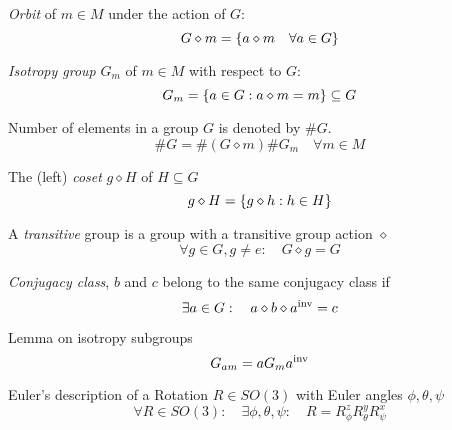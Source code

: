 			\noindent
			\emph{Orbit} of $m\in M$ under the action of $G$:
			\begin{equation}
				G \diamond m = \qty{ a\diamond m \quad \forall a \in G}
			\end{equation}

			\noindent
			\emph{Isotropy group} $G_m$ of $m\in M$ with respect to $G$:
			\begin{equation}
				G_m = \qty{a\in G: a\diamond m = m} \subseteq{G}
			\end{equation}			
			
			\noindent
			Number of elements in a group $G$ is denoted by $\# G$.
			\begin{equation}
				\# G = \#(G \diamond m) \#G_m \quad \forall m \in M
			\end{equation}

			\noindent
			The (left) \emph{coset} $g \diamond H$ of $H \subseteq G$
			\begin{equation}
				g \diamond H = \qty{g\diamond h: h\in H} 
			\end{equation}

			\noindent
			A \emph{transitive} group is a group with a transitive group action $\diamond$
			\begin{equation}
				\forall g \in G, g \ne e: \quad G \diamond g = G
			\end{equation}

			\noindent
			\emph{Conjugacy class}, $b$ and $c$ belong to the same conjugacy class if
			\begin{equation}
				\exists a \in G: \quad a \diamond b \diamond {a}^\mathrm{inv} = c
			\end{equation}

			\noindent
			Lemma on isotropy subgroups
			\begin{equation}
				G_{a m} = a G_{m} {a}^\mathrm{inv}
			\end{equation}
			
			\noindent
			Euler's description of a Rotation $R\in SO(3)$ with Euler angles $\phi, \theta, \psi$
			\begin{equation}
				\forall R \in SO(3):\quad \exists \phi, \theta, \psi:\quad R = R_\phi^z R_\theta^y R_\psi^x
			\end{equation}
			

